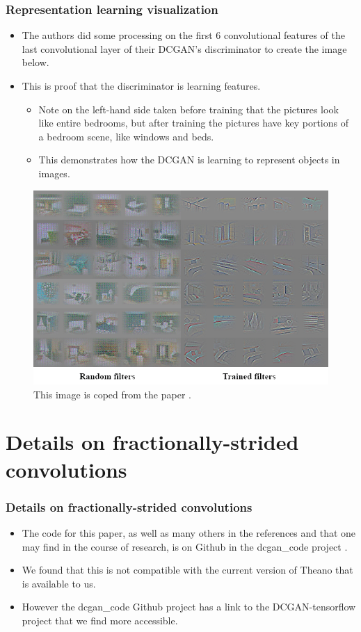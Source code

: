 \documentclass{beamer}
\begin{document}
\begin{frame}[allowframebreaks]
\frametitle{Representation learning visualization}
\begin{itemize}
\item The authors did some processing on the first 6 convolutional features of the
last convolutional layer of their DCGAN's discriminator to create the image below.  
\item This is proof that the discriminator  is learning features.  
  \begin{itemize} 
  \item Note on the
  left-hand side taken before training that the pictures look like entire bedrooms,
  but after training the pictures have key portions of a bedroom scene, like windows
  and beds.
  \item This demonstrates how the DCGAN is learning to represent objects in
  images.
  \end{itemize}
\end{itemize}
\begin{figure}
\includegraphics[scale=0.35] {feature-maps}
\caption{This image is coped from the paper \cite{repLearnDcgan}.}
\end{figure}
\end{frame}

\section{Details on fractionally-strided convolutions}
\begin{frame}[allowframebreaks]
\frametitle{Details on fractionally-strided convolutions}
\begin{itemize}
\item The code for this paper, as well as many others in the references and
that one may find in the course of research, is on Github in the dcgan\_code
project \cite{dcganCode}.

\item We found that this is not compatible with the current version of Theano that
  is available to us.  
\item However the dcgan\_code Github project has a link
to the DCGAN-tensorflow \cite{dcganTf} project that we find more accessible.
\end{itemize}
\end{frame}
\end{document}
